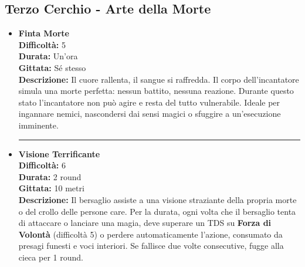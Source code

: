 \documentclass[./magie.tex]{subfiles}
\begin{document}
\clearpage
 \subsection*{Terzo Cerchio - Arte della Morte}

\begin{itemize}

\item \textbf{Finta Morte} \\
\textbf{Difficoltà:} 5 \\
\textbf{Durata:} Un'ora \\
\textbf{Gittata:} Sé stesso \\
\textbf{Descrizione:} Il cuore rallenta, il sangue si raffredda. Il corpo dell'incantatore simula una morte perfetta: nessun battito, nessuna reazione. Durante questo stato l'incantatore non può agire e resta del tutto vulnerabile. Ideale per ingannare nemici, nascondersi dai sensi magici o sfuggire a un'esecuzione imminente.

\vspace{0.5cm}\rule{\textwidth}{0.4pt}\vspace{1cm}

\item \textbf{Visione Terrificante} \\
\textbf{Difficoltà:} 6 \\
\textbf{Durata:} 2 round \\
\textbf{Gittata:} 10 metri \\
\textbf{Descrizione:} Il bersaglio assiste a una visione straziante della propria morte o del crollo delle persone care.  Per la durata, ogni volta che il bersaglio tenta di attaccare o lanciare una magia, deve superare un TDS su \textbf{Forza di Volontà} (difficoltà 5) o perdere automaticamente l'azione, consumato da presagi funesti e voci interiori. Se fallisce due volte consecutive, fugge alla cieca per 1 round.


\end{itemize}
\end{document}
